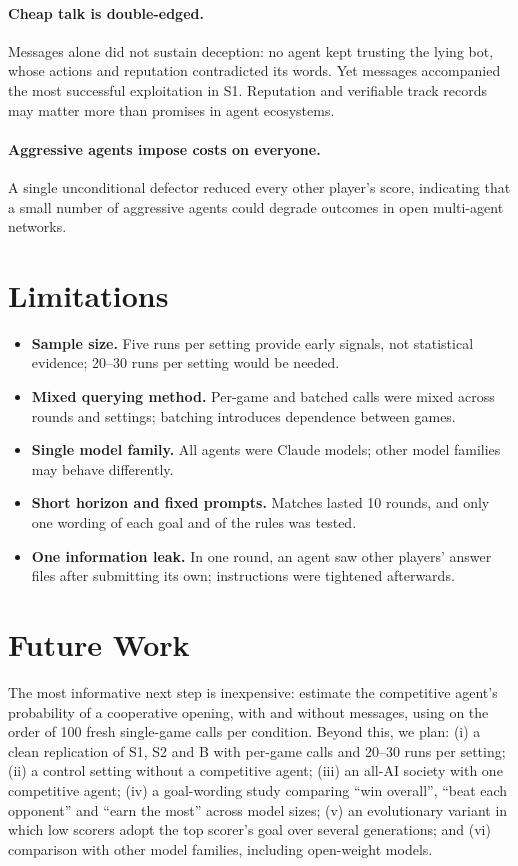 \documentclass[11pt,a4paper]{article}
\begin{document}
\paragraph{Cheap talk is double-edged.} Messages alone did not sustain deception: no agent kept trusting the lying bot, whose actions and reputation contradicted its words. Yet messages accompanied the most successful exploitation in S1. Reputation and verifiable track records may matter more than promises in agent ecosystems.

\paragraph{Aggressive agents impose costs on everyone.} A single unconditional defector reduced every other player's score, indicating that a small number of aggressive agents could degrade outcomes in open multi-agent networks.

\section{Limitations}

\begin{itemize}
  \item \textbf{Sample size.} Five runs per setting provide early signals, not statistical evidence; 20--30 runs per setting would be needed.
  \item \textbf{Mixed querying method.} Per-game and batched calls were mixed across rounds and settings; batching introduces dependence between games.
  \item \textbf{Single model family.} All agents were Claude models; other model families may behave differently.
  \item \textbf{Short horizon and fixed prompts.} Matches lasted 10 rounds, and only one wording of each goal and of the rules was tested.
  \item \textbf{One information leak.} In one round, an agent saw other players' answer files after submitting its own; instructions were tightened afterwards.
\end{itemize}

\section{Future Work}

The most informative next step is inexpensive: estimate the competitive agent's probability of a cooperative opening, with and without messages, using on the order of 100 fresh single-game calls per condition. Beyond this, we plan: (i) a clean replication of S1, S2 and B with per-game calls and 20--30 runs per setting; (ii) a control setting without a competitive agent; (iii) an all-AI society with one competitive agent; (iv) a goal-wording study comparing ``win overall'', ``beat each opponent'' and ``earn the most'' across model sizes; (v) an evolutionary variant in which low scorers adopt the top scorer's goal over several generations; and (vi) comparison with other model families, including open-weight models.
\end{document}
